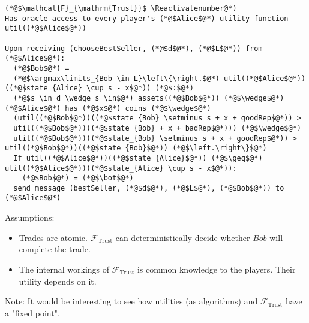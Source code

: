 \Suppressnumber
\begin{lstlisting}[label=trustfunc, style=numbers]
(*@$\mathcal{F}_{\mathrm{Trust}}$ \Reactivatenumber@*)
Has oracle access to every player's (*@$Alice$@*) utility function util((*@$Alice$@*))

Upon receiving (chooseBestSeller, (*@$d$@*), (*@$L$@*)) from (*@$Alice$@*):
  (*@$Bob$@*) =
  (*@$\argmax\limits_{Bob \in L}\left\{\right.$@*) util((*@$Alice$@*))((*@$state_{Alice} \cup s - x$@*)) (*@$:$@*)
  (*@$s \in d \wedge s \in$@*) assets((*@$Bob$@*)) (*@$\wedge$@*) (*@$Alice$@*) has (*@$x$@*) coins (*@$\wedge$@*)
  (util((*@$Bob$@*))((*@$state_{Bob} \setminus s + x + goodRep$@*)) >
  util((*@$Bob$@*))((*@$state_{Bob} + x + badRep$@*))) (*@$\wedge$@*)
  util((*@$Bob$@*))((*@$state_{Bob} \setminus s + x + goodRep$@*)) > util((*@$Bob$@*))((*@$state_{Bob}$@*)) (*@$\left.\right\}$@*)
  If util((*@$Alice$@*))((*@$state_{Alice}$@*)) (*@$\geq$@*) util((*@$Alice$@*))((*@$state_{Alice} \cup s - x$@*)):
    (*@$Bob$@*) = (*@$\bot$@*)
  send message (bestSeller, (*@$d$@*), (*@$L$@*), (*@$Bob$@*)) to (*@$Alice$@*)
\end{lstlisting}

Assumptions:
\begin{itemize}
  \item Trades are atomic. $\mathcal{F}_{\mathrm{Trust}}$ can deterministically decide whether
  $Bob$ will complete the trade.
  \item The internal workings of $\mathcal{F}_{\mathrm{Trust}}$ is common knowledge to the players.
  Their utility depends on it.
\end{itemize}
Note: It would be interesting to see how utilities (as algorithms) and
$\mathcal{F}_{\mathrm{Trust}}$ have a "fixed point".
